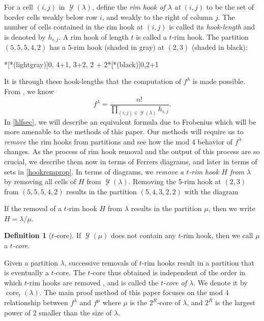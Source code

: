 \documentclass[12pt]{amsart}
\theoremstyle{definition}
\newtheorem{definition}[theorem]{Definition}
\numberwithin{equation}{section}
\newcommand{\boks}[1]{\ytableausetup{boxsize = #1cm}}
\DeclareMathOperator{\sh}{\mathcal{Y}}
\newcommand{\la}{\lambda}
\DeclareMathOperator{\core}{{core}}
\begin{document}
For a cell $(i,j)$ in $\sh(\lambda)$, define the \textit{rim hook
of $\lambda$ at $(i,j)$} to be the set of border cells weakly below row $i$, and weakly to the right of column $j$. The number of cells contained in the rim hook at $(i,j)$ is called its \textit{hook-length} and is denoted by $h_{i,j}$. A rim hook of length $t$ is called a $t$-rim hook. The partition $(5,5,5,4,2)$ has a $5$-rim hook (shaded in gray) at $(2,3)$ (shaded in black):
\begin{center}
*[*(lightgray)]{0, 4+1, 3+2, 2 + 2}*[*(black)]{0,2+1}
\end{center} 
It is through these hook-lengths that the computation of $f^\la$ is made possible. From \cite{frthook}, we know
\begin{equation}\label{eq:frt}
    f^\lambda = \frac{n!}{\prod\limits_{(i,j)\in \sh(\lambda)} h_{i,j}}.
\end{equation}
In \cref{hlfsec}, we will describe an equivalent formula due to Frobenius which will be more amenable to the methods of this paper. Our methods will require us to \textit{remove} the rim hooks from partitions and see how the mod 4 behavior of $f^\la$ changes.
As the process of rim hook removal and the output of this process are so crucial, we describe them now in terms of Ferrers diagrams, and later in terms of sets in \cref{hookremprop}. 
In terms of diagrams, we \textit{remove a $t$-rim hook $H$ from $\lambda$} by removing all cells of $H$ from $\sh(\lambda)$.
Removing the 5-rim hook at $(2,3)$ from $(5,5,5,4,2)$ results in the partition $(5,4,3,2,2)$ with the diagram \boks{0.3}
\begin{center}
\end{center} 

If the removal of a $t$-rim hook $H$ from $\la$ results in the partition $\mu$, then we write $H = \la/\mu$.
\begin{definition}[$t$-core]\label{def:core}
If $\sh(\mu)$ does not contain any $t$-rim hook, then we call $\mu$ a \textit{$t$-core}.
\end{definition}


Given a partition $\lambda$, successive removals of $t$-rim hooks result in a partition that is eventually a $t$-core. The $t$-core thus obtained is independent of the order in which $t$-rim hooks are removed \cite[Thm. 2.7.16]{james-kerber}, and is called the \textit{$t$-core of $\lambda$}. We denote it by $\core_t(\lambda)$. The main proof method of this paper focuses on the mod 4 relationship between $f^\la$ and $f^\mu$ where $\mu$ is the $2^R$-core of $\la$, and $2^R$ is the largest power of 2 smaller than the size of $\la$.
\end{document}
